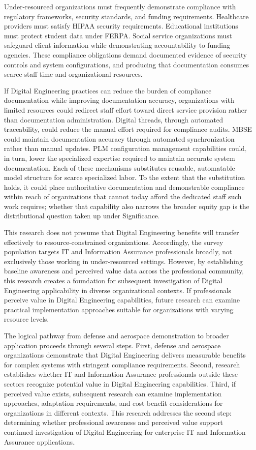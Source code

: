 Under-resourced organizations must frequently demonstrate compliance with regulatory frameworks, security standards, and funding requirements. Healthcare providers must satisfy HIPAA security requirements. Educational institutions must protect student data under FERPA\@. Social service organizations must safeguard client information while demonstrating accountability to funding agencies. These compliance obligations demand documented evidence of security controls and system configurations, and producing that documentation consumes scarce staff time and organizational resources.

If Digital Engineering practices can reduce the burden of compliance documentation while improving documentation accuracy, organizations with limited resources could redirect staff effort toward direct service provision rather than documentation administration. Digital threads, through automated traceability, could reduce the manual effort required for compliance audits. MBSE could maintain documentation accuracy through automated synchronization rather than manual updates. PLM configuration management capabilities could, in turn, lower the specialized expertise required to maintain accurate system documentation. Each of these mechanisms substitutes reusable, automatable model structure for scarce specialized labor. To the extent that the substitution holds, it could place authoritative documentation and demonstrable compliance within reach of organizations that cannot today afford the dedicated staff such work requires; whether that capability also narrows the broader equity gap is the distributional question taken up under Significance.

This research does not presume that Digital Engineering benefits will transfer effectively to resource-constrained organizations. Accordingly, the survey population targets IT and Information Assurance professionals broadly, not exclusively those working in under-resourced settings. However, by establishing baseline awareness and perceived value data across the professional community, this research creates a foundation for subsequent investigation of Digital Engineering applicability in diverse organizational contexts. If professionals perceive value in Digital Engineering capabilities, future research can examine practical implementation approaches suitable for organizations with varying resource levels.

The logical pathway from defense and aerospace demonstration to broader application proceeds through several steps. First, defense and aerospace organizations demonstrate that Digital Engineering delivers measurable benefits for complex systems with stringent compliance requirements. Second, research establishes whether IT and Information Assurance professionals outside these sectors recognize potential value in Digital Engineering capabilities. Third, if perceived value exists, subsequent research can examine implementation approaches, adaptation requirements, and cost-benefit considerations for organizations in different contexts. This research addresses the second step: determining whether professional awareness and perceived value support continued investigation of Digital Engineering for enterprise IT and Information Assurance applications.

